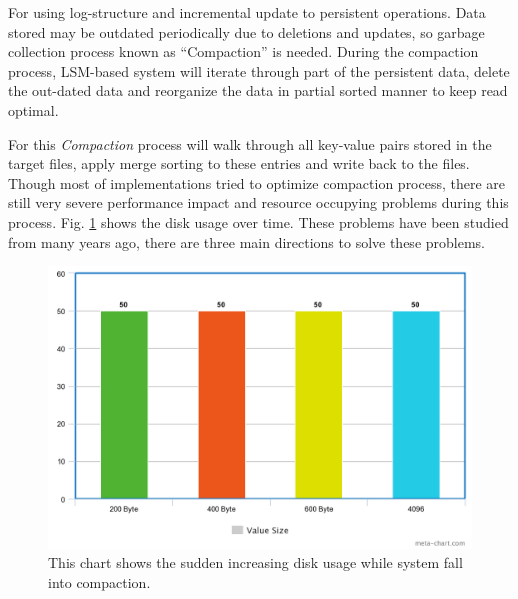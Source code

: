 For using log-structure and incremental update to persistent operations. Data stored may be outdated periodically due to deletions and updates, so garbage collection process known as ``Compaction'' is needed. During the compaction process, LSM-based system will iterate through part of the persistent data, delete the out-dated data and reorganize the data in partial sorted manner to keep read optimal.

For this \textit{Compaction} process will walk through all key-value pairs stored in the target files, apply merge sorting to these entries and write back to the files. Though most of implementations tried to optimize compaction process, there are still very severe performance impact and resource occupying problems during this process. Fig. \ref{fig:disk_usage} shows the disk usage over time. These problems have been studied from many years ago, there are three main directions to solve these problems. 

\begin{figure}
	\centering
	\includegraphics[width=0.7\columnwidth]{fig/meta-chart}
	\caption{This chart shows the sudden increasing disk usage while system fall into compaction.}
	\label{fig:disk_usage}
\end{figure}

